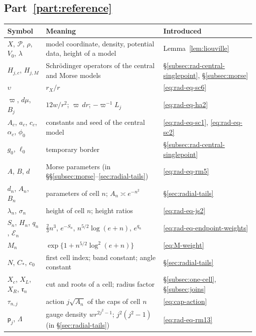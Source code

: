 \subsection*{Part~\ref{part:reference}}

\begin{longtable}{@{}p{.23\linewidth}p{.52\linewidth}p{.19\linewidth}@{}}
\toprule
Symbol & Meaning & Introduced\\
\midrule
\endhead
$X$, $\mathcal P$, $\rho$, $V_0$, $\lambda$ & model coordinate,
 density, potential data, height of a model & Lemma~\ref{lem:liouville}\\
$H_{j,c}$, $H_{j,M}$ & Schr\"odinger operators of the central and
 Morse models & \S\ref{subsec:rad-central-singlepoint}, \S\ref{subsec:morse}\\
$\upsilon$ & $r_X/r$ & \eqref{eq:rad-eq-sc6}\\
$\varpi$, $d\mu$, $B_j$ & $12w/r^2$; $\varpi\,dr$; $-\varpi^{-1}L_j$
 & \eqref{eq:rad-eq-ha2}\\
$A_c$, $a_c$, $c_c$, $\alpha_c$, $\phi_0$ & constants and seed of the
 central model & \eqref{eq:rad-eq-sc1}, \eqref{eq:rad-eq-sc2}\\
$g_0$, $\ell_0$ & temporary border & \S\ref{subsec:rad-central-singlepoint}\\
$A$, $B$, $d$ & Morse parameters (in \S\S\ref{subsec:morse}--\ref{sec:radial-tails})
 & \eqref{eq:rad-eq-rm5}\\
$d_n$, $A_n$, $B_n$ & parameters of cell $n$; $A_n\asymp e^{-n^2}$
 & \S\ref{sec:radial-tails}\\
$\lambda_n$, $\sigma_n$ & height of cell $n$; height ratios
 & \eqref{eq:rad-eq-js2}\\
$S_n$, $H_n$, $q_n$, $\mathcal E_n$ & $\tfrac23n^3$, $e^{-S_n}$,
 $n^{5/2}\log(e+n)$, $e^{q_n}$ & \eqref{eq:rad-eq-endpoint-weights}\\
$M_n$ & $\exp\{1+n^{5/2}\log^2(e+n)\}$ & \eqref{eq:M-weight}\\
$N$, $C_*$, $c_0$ & first cell index; band constant; angle constant
 & \S\ref{sec:radial-tails}\\
$X_c$, $X_L$, $X_R$, $\mathfrak r_n$ & cut and roots of a cell;
 radius factor & \S\ref{subsec:one-cell}, \S\ref{subsec:joins}\\
$\tau_{n,j}$ & action $j\sqrt{A_n}$ of the caps of cell $n$
 & \eqref{eq:cap-action}\\
$\mathsf p_j$, $\Lambda$ & gauge density $wr^{2j^2-1}$;
 $j^2(j^2-1)$ (in \S\ref{sec:radial-tails}) & \eqref{eq:rad-eq-rm13}\\

\end{longtable}
